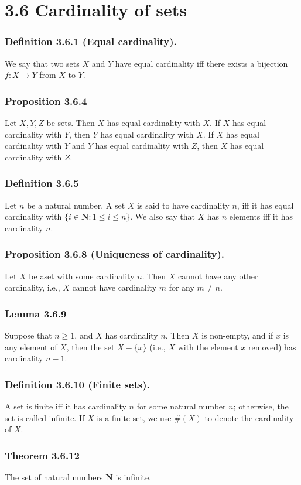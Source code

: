 \documentclass[12pt, letter]{article}
\begin{document}
\section*{3.6 Cardinality of sets}
\subsubsection*{Definition 3.6.1 (Equal cardinality).}
We say that two sets $X$ and $Y$ have equal cardinality iff there exists a bijection $f:X\to Y$ from $X$ to $Y$.
\subsubsection*{Proposition 3.6.4}
Let $X,Y,Z$ be sets. Then $X$ has equal cardinality with $X$. If $X$ has equal cardinality with $Y$, then $Y$ has equal cardinality with $X$.
If $X$ has equal cardinality with $Y$ and $Y$ has equal cardinality with $Z$, then $X$ has equal cardinality with $Z$.
\subsubsection*{Definition 3.6.5}
Let $n$ be a natural number. A set $X$ is said to have cardinality $n$, iff it has equal cardinality with $\{i\in\mathbf{N}:1\leq i\leq n\}$. We also say that $X$ has
$n$ elements iff it has cardinality $n$.
\subsubsection*{Proposition 3.6.8 (Uniqueness of cardinality).}
Let $X$ be aset with some cardinality $n$. Then $X$ cannot have any other cardinality, i.e., $X$ cannot have cardinality $m$ for any $m\ne n$. 
\subsubsection*{Lemma 3.6.9}
Suppose that $n\geq 1$, and $X$ has cardinality $n$. Then $X$ is non-empty, and if $x$ is any element of $X$, then the set $X-\{x\}$ (i.e., $X$ with the element $x$ removed)
has cardinality $n-1$.
\subsubsection*{Definition 3.6.10 (Finite sets).}
A set is finite iff it has cardinality $n$ for some natural number $n$; otherwise, the set is called infinite. If $X$ is a finite set, we use $\#(X)$
to denote the cardinality of $X$.
\subsubsection*{Theorem 3.6.12}
The set of natural numbers $\mathbf{N}$ is infinite.
\end{document}
